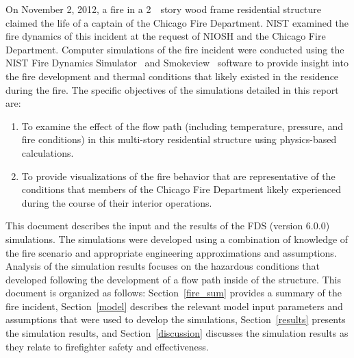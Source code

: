 \documentclass[12pt,oneside]{book}
\begin{document}
On November 2, 2012, a fire in a 2~~story wood frame residential structure claimed the life of a captain of the Chicago Fire Department. NIST examined the fire dynamics of this incident at the request of NIOSH and the Chicago Fire Department. Computer simulations of the fire incident were conducted using the NIST Fire Dynamics Simulator~\cite{FDS_Users_Guide} and Smokeview~\cite{Smokeview_Users_Guide}  software to provide insight into the fire development and thermal conditions that likely existed in the residence during the fire. The specific objectives of the simulations detailed in this report are: 
\begin{enumerate}
\item To examine the effect of the flow path (including temperature, pressure, and fire conditions) in this multi-story residential structure using physics-based calculations.
\item To provide visualizations of the fire behavior that are representative of the conditions that members of the Chicago Fire Department likely experienced during the course of their interior operations.
\end{enumerate}
This document describes the input and the results of the FDS (version 6.0.0) simulations. The simulations were developed using a combination of knowledge of the fire scenario and appropriate engineering approximations and assumptions. Analysis of the simulation results focuses on the hazardous conditions that developed following the development of a flow path inside of the structure. This document is organized as follows: Section~\ref{fire_sum} provides a summary of the fire incident, Section~\ref{model} describes the relevant model input parameters and assumptions that were used to develop the simulations, Section~\ref{results} presents the simulation results, and Section~\ref{discussion} discusses the simulation results as they relate to firefighter safety and effectiveness. 
\end{document}
